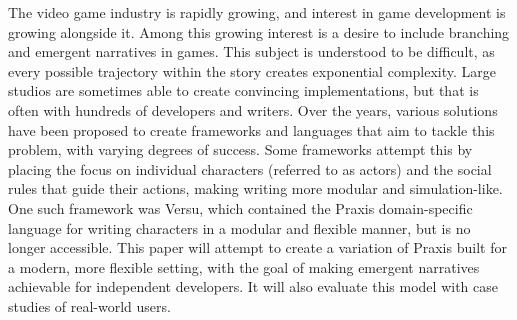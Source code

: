 The video game industry is rapidly growing, and interest in game development is growing alongside it. Among this growing interest is a desire to include branching and emergent narratives in games. This subject is understood to be difficult, as every possible trajectory within the story creates exponential complexity. Large studios are sometimes able to create convincing implementations, but that is often with hundreds of developers and writers. Over the years, various solutions have been proposed to create frameworks and languages that aim to tackle this problem, with varying degrees of success. Some frameworks attempt this by placing the focus on individual characters (referred to as actors) and the social rules that guide their actions, making writing more modular and simulation-like. One such framework was Versu, which contained the Praxis domain-specific language for writing characters in a modular and flexible manner, but is no longer accessible. This paper will attempt to create a variation of Praxis built for a modern, more flexible setting, with the goal of making emergent narratives achievable for independent developers. It will also evaluate this model with case studies of real-world users.
